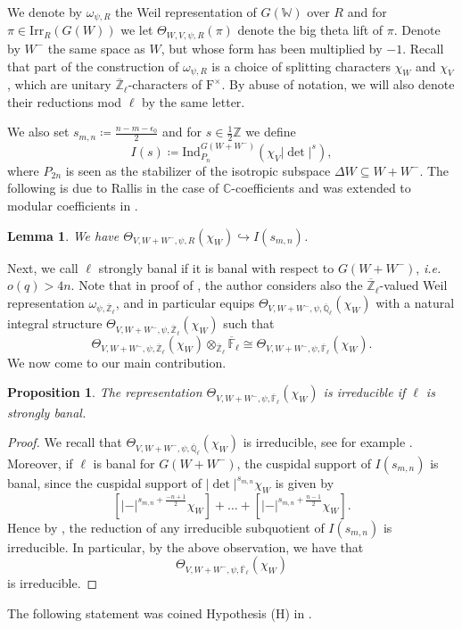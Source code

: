 \documentclass[10pt,a4paper]{article}
\newtheorem{lemma}{Lemma}
\newtheorem{prop}{Proposition}
\theoremstyle{remark}
\theoremstyle{definition}
\newcommand{\fl}{{\overline{\mathbb{F}}_\ell}}
\newcommand{\ql}{{\overline{\mathbb{Q}}_\ell}}
\newcommand{\zl}{{\overline{\mathbb{Z}}_\ell}}
\newcommand{\bl}{\otimes_\zl\fl}
\newcommand{\id}{\mathrm{Ind}}
\newcommand{\irr}{\mathrm{Irr}}
\newcommand{\FF}{\mathrm{F}}
\newcommand{\hra}{\hookrightarrow}
\newcommand{\ZZ}{\mathbb{Z}}
\newcommand{\CC}{\mathbb{C}}
\newcommand{\WW}{\mathbb{W}}
\begin{document}
We denote by $\omega_{\psi,R}$ the Weil representation of $G(\WW)$ over $R$ and for $\pi\in\irr_R(G(W))$ we let $\Theta_{W,V,\psi,R}(\pi)$ denote the big theta lift of $\pi$.
Denote by $W^-$ the same space as $W$, but whose form has been multiplied by $-1$. Recall that part of the construction of $\omega_{\psi,R}$ is a choice of splitting characters $\chi_W$ and $\chi_V$, which are unitary $\zl$-characters of $\FF^\times$.
By abuse of notation, we will also denote their reductions mod $\ell$ by the same letter.

We also set $s_{m,n}\coloneqq \frac{n-m-\epsilon_0}{2}$ and for $s\in\frac{1}{2}\ZZ$ we define
\[I(s)\coloneqq \id_{P_{n}}^{G(W+W^-)}(\chi_V\lvert\det\lvert^{s}),\] where $P_{2n}$ is seen as the stabilizer of the isotropic subspace $\Delta W\subseteq W+W^-$.
The following is due to Rallis in the case of $\CC$-coefficients and was extended to modular coefficients in \cite{Trias2025}.
\begin{lemma}
    We have $\Theta_{V,W+W^-,\psi,R}(\chi_W)\hra I(s_{m,n})$.
\end{lemma}
Next, we call $\ell$ strongly banal if it is banal with respect to $G(W+W^-)$, \emph{i.e.} $o(q)> 4n$.
Note that in proof of \cite[Proposition 6.17]{Trias2025}, the author considers also the $\zl$-valued Weil representation $\omega_{\psi,\zl}$, and in particular equips $\Theta_{V,W+W^-,\psi,\ql}(\chi_W)$ with a natural integral structure $\Theta_{V,W+W^-,\psi,\zl}(\chi_W)$ such that
\[\Theta_{V,W+W^-,\psi,\zl}(\chi_W)\bl\cong \Theta_{V,W+W^-,\psi,\fl}(\chi_W).\]
We now come to our main contribution.
\begin{prop}\label{P:H}
    The representation $\Theta_{V,W+W^-,\psi,\fl}(\chi_W)$ is irreducible if $\ell$ is strongly banal.
\end{prop}
\begin{proof}
    We recall that $\Theta_{V,W+W^-,\psi,\ql}(\chi_W)$ is irreducible, see for example \cite[Proposition 7.2]{GanIch16}. Moreover, if $\ell$ is banal for $G(W+W^-)$, the cuspidal support of $I(s_{m,n})$ is banal, since the cuspidal support of $\lvert\det\lvert^{s_{m,n}}\chi_W$ is given by
    \[[\lvert-\rvert^{s_{m,n}+\frac{-n+1}{2}}\chi_W]+\ldots+[\lvert-\rvert^{s_{m,n}+\frac{n-1}{2}}\chi_W].\]
    Hence by , the reduction of any irreducible subquotient of $I(s_{m,n})$ is irreducible. In particular, by the above observation, we have that 
    \[\Theta_{V,W+W^-,\psi,\fl}(\chi_W)\] is irreducible.
\end{proof}
The following statement was coined Hypothesis (H) in \cite{Trias2025}.
\end{document}
